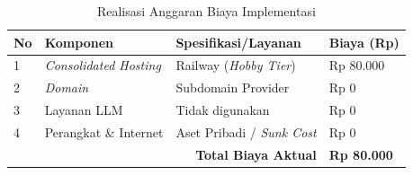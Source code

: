\begin{table}[!ht]
    \centering
    \caption{Realisasi Anggaran Biaya Implementasi}
    \label{tbl:realisasi_rab}
    \begin{tabular}{|p{}|p{}|p{}|p{}|}
        \hline
        \textbf{No} & \textbf{Komponen} & \textbf{Spesifikasi/Layanan} & \textbf{Biaya (Rp)} \\
        \hline
        1 & \textit{Consolidated Hosting} & Railway (\textit{Hobby Tier}) & Rp 80.000 \\
        \hline
        2 & \textit{Domain} & Subdomain Provider & Rp 0 \\
        \hline
        3 & Layanan LLM & Tidak digunakan & Rp 0 \\
        \hline
        4 & Perangkat \& Internet & Aset Pribadi / \textit{Sunk Cost} & Rp 0 \\
        \hline
        \multicolumn{3}{|r|}{\textbf{Total Biaya Aktual}} & \textbf{Rp 80.000} \\
        \hline
    \end{tabular}
\end{table}